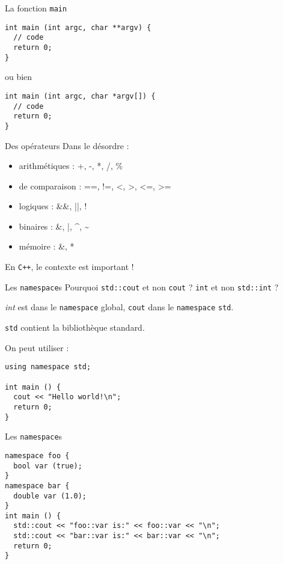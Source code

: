 \begin{frame}[fragile]{La fonction \texttt{main}}
  \begin{lstlisting}
int main (int argc, char **argv) {
  // code
  return 0;
}
  \end{lstlisting}
 ou bien
  \begin{lstlisting}
int main (int argc, char *argv[]) {
  // code
  return 0;
}
  \end{lstlisting}
\end{frame}

\begin{frame}{Des opérateurs}
  Dans le désordre :
  \begin{itemize}
  \item arithmétiques : +, -, *, /, \%
  \item de comparaison : ==, !=, <, >, <=, >=
  \item logiques : \&\&, ||, !
  \item binaires : \&, |, \^{}, \~{}
  \item mémoire : \&, *
  \end{itemize}

  En \texttt{C++}, le contexte est important !
\end{frame}

\begin{frame}[fragile]{Les \texttt{namespace}s}
  Pourquoi \texttt{std::cout} et non \texttt{cout} ? \texttt{int} et non \texttt{std::int} ?
  
  \textit{int} est dans le \texttt{namespace} global, \texttt{cout} dans le \texttt{namespace} \texttt{std}.
  
  \texttt{std} contient la bibliothèque standard.

  On peut utiliser :
  \begin{lstlisting}
using namespace std;

int main () {
  cout << "Hello world!\n";
  return 0;
}
  \end{lstlisting}
\end{frame}

\begin{frame}[fragile]{Les \texttt{namespace}s}
  \begin{lstlisting}
namespace foo {
  bool var (true);
}
namespace bar {
  double var (1.0);
}
int main () {
  std::cout << "foo::var is:" << foo::var << "\n";
  std::cout << "bar::var is:" << bar::var << "\n";
  return 0;
}
  \end{lstlisting}
\end{frame}
